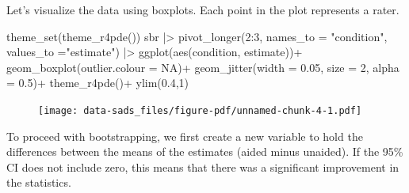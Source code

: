 \documentclass[
  letterpaper,
]{book}
\newenvironment{Shaded}{\begin{snugshade}}{\end{snugshade}}
\newcommand{\AttributeTok}[1]{\textcolor[rgb]{0.40,0.45,0.13}{#1}}
\newcommand{\CommentTok}[1]{\textcolor[rgb]{0.37,0.37,0.37}{#1}}
\newcommand{\ConstantTok}[1]{\textcolor[rgb]{0.56,0.35,0.01}{#1}}
\newcommand{\DecValTok}[1]{\textcolor[rgb]{0.68,0.00,0.00}{#1}}
\newcommand{\FloatTok}[1]{\textcolor[rgb]{0.68,0.00,0.00}{#1}}
\newcommand{\FunctionTok}[1]{\textcolor[rgb]{0.28,0.35,0.67}{#1}}
\newcommand{\NormalTok}[1]{\textcolor[rgb]{0.00,0.23,0.31}{#1}}
\newcommand{\OtherTok}[1]{\textcolor[rgb]{0.00,0.23,0.31}{#1}}
\newcommand{\SpecialCharTok}[1]{\textcolor[rgb]{0.37,0.37,0.37}{#1}}
\newcommand{\StringTok}[1]{\textcolor[rgb]{0.13,0.47,0.30}{#1}}
\begin{document}
Let's visualize the data using boxplots. Each point in the plot
represents a rater.

\begin{Shaded}
\begin{Highlighting}[]
\FunctionTok{theme\_set}\NormalTok{(}\FunctionTok{theme\_r4pde}\NormalTok{())}
\NormalTok{sbr }\SpecialCharTok{|\textgreater{}} 
  \FunctionTok{pivot\_longer}\NormalTok{(}\DecValTok{2}\SpecialCharTok{:}\DecValTok{3}\NormalTok{, }\AttributeTok{names\_to =} \StringTok{"condition"}\NormalTok{, }\AttributeTok{values\_to =}\StringTok{"estimate"}\NormalTok{) }\SpecialCharTok{|\textgreater{}} 
  \FunctionTok{ggplot}\NormalTok{(}\FunctionTok{aes}\NormalTok{(condition, estimate))}\SpecialCharTok{+}
  \FunctionTok{geom\_boxplot}\NormalTok{(}\AttributeTok{outlier.colour =} \ConstantTok{NA}\NormalTok{)}\SpecialCharTok{+}
  \FunctionTok{geom\_jitter}\NormalTok{(}\AttributeTok{width =} \FloatTok{0.05}\NormalTok{, }\AttributeTok{size =} \DecValTok{2}\NormalTok{, }\AttributeTok{alpha =} \FloatTok{0.5}\NormalTok{)}\SpecialCharTok{+}
  \FunctionTok{theme\_r4pde}\NormalTok{()}\SpecialCharTok{+}
  \FunctionTok{ylim}\NormalTok{(}\FloatTok{0.4}\NormalTok{,}\DecValTok{1}\NormalTok{)}
\end{Highlighting}
\end{Shaded}

\begin{figure}[H]

{\centering \texttt{[image: data-sads\_files/figure-pdf/unnamed-chunk-4-1.pdf]}

}

\end{figure}

To proceed with bootstrapping, we first create a new variable to hold
the differences between the means of the estimates (aided minus
unaided). If the 95\% CI does not include zero, this means that there
was a significant improvement in the statistics.

\begin{Shaded}
\end{Shaded}
\end{document}
